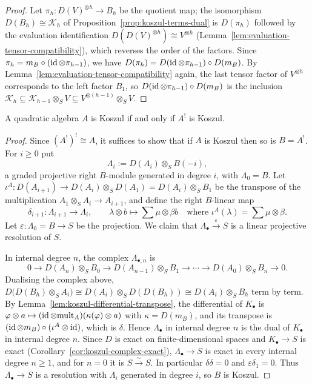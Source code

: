 \begin{supplementary}
\begin{proof}
Let $\pi_h:D(V)^{\otimes h}\to B_h$ be the quotient map; the isomorphism $D(B_h)\cong\mathcal K_h$ of Proposition~\ref{prop:koszul-terms-dual} is $D(\pi_h)$ followed by the evaluation identification $D(D(V)^{\otimes h})\cong V^{\otimes h}$ (Lemma~\ref{lem:evaluation-tensor-compatibility}), which reverses the order of the factors.
Since $\pi_h=m_B\circ(\operatorname{id}\otimes\pi_{h-1})$, we have $D(\pi_h)=D(\operatorname{id}\otimes\pi_{h-1})\circ D(m_B)$.
By Lemma~\ref{lem:evaluation-tensor-compatibility} again, the last tensor factor of $V^{\otimes h}$ corresponds to the left factor $B_1$, so $D(\operatorname{id}\otimes\pi_{h-1})\circ D(m_B)$ is the inclusion $\mathcal K_h\subseteq\mathcal K_{h-1}\otimes_SV\subseteq V^{\otimes(h-1)}\otimes_SV$.
\end{proof}
\end{supplementary}

\begin{theorem}\label{thm:koszul-dual-koszul}
A quadratic algebra $A$ is Koszul if and only if $A^!$ is Koszul.
\end{theorem}

\begin{proof}
Since $(A^!)^!\cong A$, it suffices to show that if $A$ is Koszul then so is $B=A^!$.
For $i\geq0$ put
\[
\Lambda_i:=D(A_i)\otimes_SB(-i),
\]
a graded projective right $B$-module generated in degree $i$, with $\Lambda_0=B$.
Let $\iota^A:D(A_{i+1})\to D(A_i)\otimes_SD(A_1)=D(A_i)\otimes_SB_1$ be the transpose of the multiplication $A_1\otimes_SA_i\to A_{i+1}$, and define the right $B$-linear map
\[
\delta_{i+1}:\Lambda_{i+1}\to\Lambda_i,\qquad\lambda\otimes b\longmapsto\sum\mu\otimes\beta b\quad\text{where }\iota^A(\lambda)=\sum\mu\otimes\beta.
\]
Let $\varepsilon:\Lambda_0=B\to S$ be the projection.
We claim that $\Lambda_\bullet\xrightarrow{\varepsilon}S$ is a linear projective resolution of $S$.

In internal degree $n$, the complex $\Lambda_{\bullet,n}$ is
\[
0\to D(A_n)\otimes_SB_0\to D(A_{n-1})\otimes_SB_1\to\cdots\to D(A_0)\otimes_SB_n\to0.
\]
Dualising the complex above, $D\bigl(D(B_h)\otimes_SA_i\bigr)\cong D(A_i)\otimes_SD(D(B_h))\cong D(A_i)\otimes_SB_h$ term by term.
By Lemma~\ref{lem:koszul-differential-transpose}, the differential of $K_\bullet$ is $\varphi\otimes a\mapsto(\operatorname{id}\otimes\mathrm{mult}_A)(\kappa(\varphi)\otimes a)$ with $\kappa=D(m_B)$, and its transpose is $(\operatorname{id}\otimes m_B)\circ(\iota^A\otimes\operatorname{id})$, which is $\delta$.
Hence $\Lambda_\bullet$ in internal degree $n$ is the dual of $K_\bullet$ in internal degree $n$.
Since $D$ is exact on finite-dimensional spaces and $K_\bullet\to S$ is exact (Corollary~\ref{cor:koszul-complex-exact}), $\Lambda_\bullet\to S$ is exact in every internal degree $n\geq1$, and for $n=0$ it is $S\xrightarrow{\ \sim\ }S$.
In particular $\delta\delta=0$ and $\varepsilon\delta_1=0$.
Thus $\Lambda_\bullet\to S$ is a resolution with $\Lambda_i$ generated in degree $i$, so $B$ is Koszul.
\end{proof}

